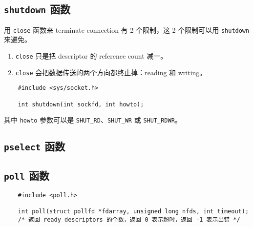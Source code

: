   \subsection{\texttt{shutdown} 函数}

    用 \texttt{close} 函数来 terminate connection 有 2 个限制，这 2 个限制可以用 \texttt{shutdown} 来避免。

    \begin{enumerate}
      \item \texttt{close} 只是把 descriptor 的 reference count 减一。
      \item \texttt{close} 会把数据传送的两个方向都终止掉：reading 和 writing。
    \end{enumerate}

    \begin{verbatim}
    #include <sys/socket.h>

    int shutdown(int sockfd, int howto);
    \end{verbatim}

    其中 \texttt{howto} 参数可以是 \texttt{SHUT\_RD}、\texttt{SHUT\_WR} 或 \texttt{SHUT\_RDWR}。

  \subsection{\texttt{pselect} 函数}

  \subsection{\texttt{poll} 函数}

    \begin{verbatim}
    #include <poll.h>

    int poll(struct pollfd *fdarray, unsigned long nfds, int timeout);
    /* 返回 ready descriptors 的个数，返回 0 表示超时，返回 -1 表示出错 */
    \end{verbatim}
    